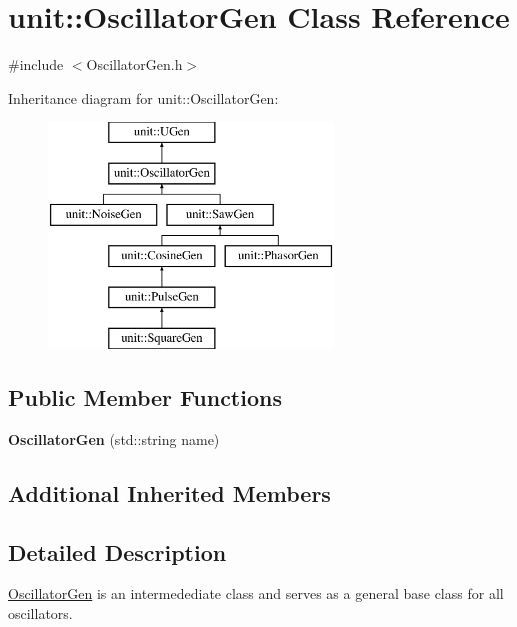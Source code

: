 \hypertarget{classunit_1_1OscillatorGen}{\section{unit\-:\-:Oscillator\-Gen Class Reference}
\label{classunit_1_1OscillatorGen}
}


{\ttfamily \#include $<$Oscillator\-Gen.\-h$>$}

Inheritance diagram for unit\-:\-:Oscillator\-Gen\-:\begin{figure}[H]
\begin{center}
\leavevmode
\includegraphics[height=6.000000cm]{classunit_1_1OscillatorGen}
\end{center}
\end{figure}
\subsection*{Public Member Functions}
\begin{DoxyCompactItemize}
\item 
\hypertarget{classunit_1_1OscillatorGen_ab84067cdd1c0a20d238ddcaaadda12da}{{\bfseries Oscillator\-Gen} (std\-::string name)}\label{classunit_1_1OscillatorGen_ab84067cdd1c0a20d238ddcaaadda12da}

\end{DoxyCompactItemize}
\subsection*{Additional Inherited Members}


\subsection{Detailed Description}
\hyperlink{classunit_1_1OscillatorGen}{Oscillator\-Gen} is an intermedediate class and serves as a general base class for all oscillators.

